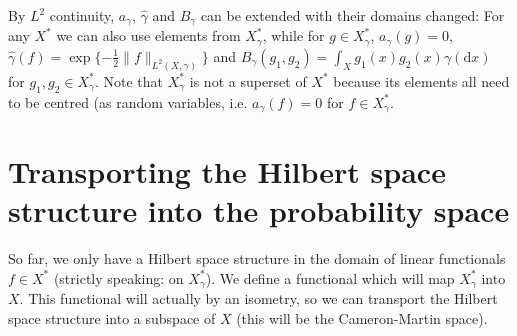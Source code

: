 \documentclass{scrartcl}
\theoremstyle{definition}
\theoremstyle{remark}
\newcommand{\de}{\mathrm d}
\begin{document}
By $L^2$ continuity, $a_\gamma$, $\hat \gamma$ and $B_\gamma$ can be extended with their domains changed: For any $X^*$ we can also use elements from $X_\gamma^*$, while for $g\in X_\gamma^*$, $a_\gamma(g) = 0$, $\hat \gamma(f) = \exp\{-\frac{1}{2}\|f\|_{L^2(X,\gamma)}\}$ and $B_\gamma(g_1, g_2) = \int_X g_1(x)g_2(x)\gamma(\de x)$ for $g_1,g_2\in X_\gamma^*$. Note that $X_\gamma^*$ is not a superset of $X^*$ because its elements all need to be centred (as random variables, i.e. $a_\gamma(f) = 0$ for $f\in X_\gamma^*$.

\section{Transporting the Hilbert space structure into the probability space}\label{sec:CM}
So far, we only have a Hilbert space structure in the domain of linear functionals $f\in X^*$ (strictly speaking: on $X_\gamma^*$). We define a functional which will map $X_\gamma^*$ into $X$. This functional will actually by an isometry, so we can transport the Hilbert space structure into a subspace of $X$ (this will be the Cameron-Martin space).
\end{document}
